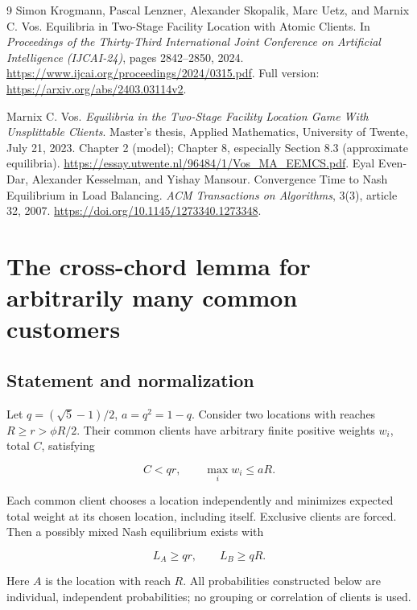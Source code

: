 \documentclass[11pt,a4paper]{article}
\begin{document}
\begin{thebibliography}{9}
Simon Krogmann, Pascal Lenzner, Alexander Skopalik, Marc Uetz, and Marnix C. Vos.
\newblock Equilibria in Two-Stage Facility Location with Atomic Clients.
\newblock In \emph{Proceedings of the Thirty-Third International Joint Conference on Artificial Intelligence (IJCAI-24)}, pages 2842--2850, 2024.
\newblock \url{https://www.ijcai.org/proceedings/2024/0315.pdf}.
\newblock Full version: \url{https://arxiv.org/abs/2403.03114v2}.

Marnix C. Vos.
\newblock \emph{Equilibria in the Two-Stage Facility Location Game With Unsplittable Clients}.
\newblock Master's thesis, Applied Mathematics, University of Twente, July 21, 2023.
\newblock Chapter 2 (model); Chapter 8, especially Section 8.3 (approximate equilibria).
\newblock \url{https://essay.utwente.nl/96484/1/Vos_MA_EEMCS.pdf}.
Eyal Even-Dar, Alexander Kesselman, and Yishay Mansour.
\newblock Convergence Time to Nash Equilibrium in Load Balancing.
\newblock \emph{ACM Transactions on Algorithms}, 3(3), article 32, 2007.
\newblock \url{https://doi.org/10.1145/1273340.1273348}.
\end{thebibliography}

\clearpage
\appendix
\section{The cross-chord lemma for arbitrarily many common customers}
\label{app:cross-chord}
\subsection*{Statement and normalization}

Let \(q=(\sqrt5-1)/2\), \(a=q^2=1-q\). Consider two locations with reaches \(R\ge r>\phi R/2\). Their common clients have arbitrary finite positive weights \(w_i\), total \(C\), satisfying

\[
C<qr,\qquad \max_i w_i\le aR.
\]

Each common client chooses a location independently and minimizes expected total weight at its chosen location, including itself. Exclusive clients are forced. Then a possibly mixed Nash equilibrium exists with

\[
L_A\ge qr,\qquad L_B\ge qR.
\]

Here \(A\) is the location with reach \(R\). All probabilities constructed below are individual, independent probabilities; no grouping or correlation of clients is used.
\end{document}
